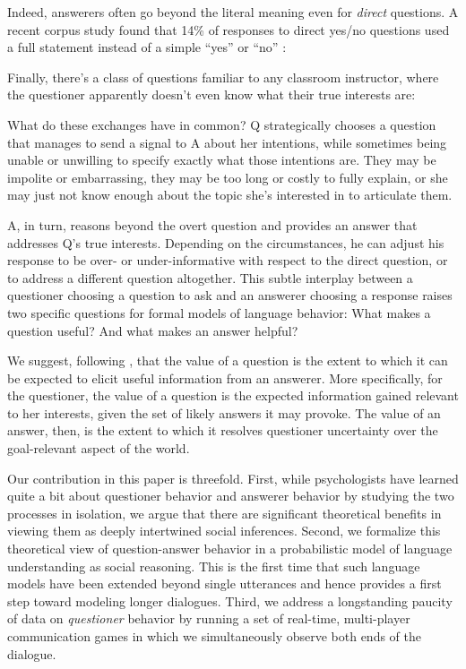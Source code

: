 \documentclass[12pt, floatsintext, jou]{apa6}
\begin{document}
Indeed, answerers often go beyond the literal meaning even for \emph{direct} questions. A recent corpus study found that 14\% of responses to direct yes/no questions used a full statement instead of a simple ``yes'' or ``no'' \cite{DeMarneffeGrimmPotts09_IndirectAnswersCorpus}:


Finally, there's a class of questions familiar to any classroom instructor, where the questioner apparently doesn't even know what their true interests are:


 What do these exchanges have in common? Q strategically chooses a question that manages to send a signal to A about her intentions, while sometimes being unable or unwilling to specify exactly what those intentions are. They may be impolite or embarrassing, they may be too long or costly to fully explain, or she may just not know enough about the topic she's interested in to articulate them.

A, in turn, reasons beyond the overt question and provides an answer that addresses Q's true interests. Depending on the circumstances, he can adjust his response to be over- or under-informative with respect to the direct question, or to address a different question altogether.  This subtle interplay between a questioner choosing a question to ask and an answerer choosing  a response raises two specific questions for formal models of language behavior: What makes a question useful? And what makes an answer helpful? 

We suggest, following , that the value of a question is the extent to which it can be expected to elicit useful information from an answerer. 
More specifically, for the questioner, the value of a question is the expected information gained relevant to her interests, given the set of likely answers it may provoke. The value of an answer, then, is the extent to which it resolves questioner uncertainty over the goal-relevant aspect of the world. 

Our contribution in this paper is threefold. First, while psychologists have learned quite a bit about questioner behavior and answerer behavior by studying the two processes in isolation, we argue that there are significant theoretical benefits in viewing them as deeply intertwined social inferences. Second, we formalize this theoretical view of question-answer behavior in a probabilistic model of language understanding as social reasoning. This is the first time that such language models have been extended beyond single utterances and hence provides a first step toward modeling longer dialogues. Third, we address a longstanding paucity of data on \emph{questioner} behavior by running a set of real-time, multi-player communication games in which we simultaneously observe both ends of the dialogue. 
\end{document}
